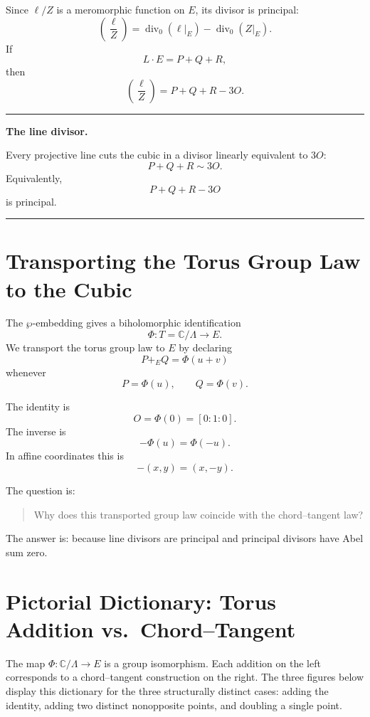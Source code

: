 \documentclass[11pt]{article}
\newcommand{\C}{\mathbb{C}}
\newcommand{\divisor}{\operatorname{div}}
\newenvironment{keyidea}[1]{%
  \par\medskip
  \begin{center}
  \begin{minipage}{0.92\textwidth}
  \hrule
  \smallskip
  \textbf{#1.}\quad\ignorespaces
}{%
  \smallskip
  \hrule
  \end{minipage}
  \end{center}
  \medskip
}
\begin{document}
Since \(\ell/Z\) is a meromorphic function on \(E\), its divisor is
principal:
\[
\left(\frac{\ell}{Z}\right)
=
\divisor_0(\ell|_E)-\divisor_0(Z|_E).
\]
If
\[
L\cdot E=P+Q+R,
\]
then
\[
\boxed{
\left(\frac{\ell}{Z}\right)=P+Q+R-3O.
}
\]

\begin{keyidea}{The line divisor}
Every projective line cuts the cubic in a divisor linearly equivalent to
\(3O\):
\[
P+Q+R\sim3O.
\]
Equivalently,
\[
P+Q+R-3O
\]
is principal.
\end{keyidea}

\section{Transporting the Torus Group Law to the Cubic}

The \(\wp\)-embedding gives a biholomorphic identification
\[
\Phi:T=\C/\Lambda\longrightarrow E.
\]
We transport the torus group law to \(E\) by declaring
\[
P+_E Q
=
\Phi(u+v)
\]
whenever
\[
P=\Phi(u),
\qquad
Q=\Phi(v).
\]

The identity is
\[
O=\Phi(0)=[0:1:0].
\]
The inverse is
\[
-\Phi(u)=\Phi(-u).
\]
In affine coordinates this is
\[
-(x,y)=(x,-y).
\]

The question is:

\begin{quote}
Why does this transported group law coincide with the chord--tangent law?
\end{quote}

The answer is: because line divisors are principal and principal divisors
have Abel sum zero.

\section{Pictorial Dictionary: Torus Addition vs.\ Chord--Tangent}
\label{sec:dictionary}

The map \(\Phi:\C/\Lambda\to E\) is a group isomorphism.  Each addition on the
left corresponds to a chord--tangent construction on the right.  The three
figures below display this dictionary for the three structurally distinct
cases: adding the identity, adding two distinct nonopposite points, and
doubling a single point.
\end{document}
